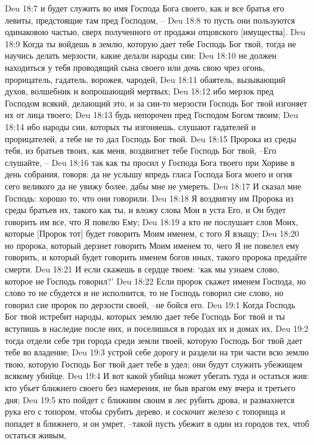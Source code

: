 Deu 18:7  и будет служить во имя Господа Бога своего, как и все братья его левиты, предстоящие там пред Господом, --
Deu 18:8  то пусть они пользуются одинаковою частью, сверх полученного от продажи отцовского [имущества].
Deu 18:9  Когда ты войдешь в землю, которую дает тебе Господь Бог твой, тогда не научись делать мерзости, какие делали народы сии:
Deu 18:10  не должен находиться у тебя проводящий сына своего или дочь свою чрез огонь, прорицатель, гадатель, ворожея, чародей,
Deu 18:11  обаятель, вызывающий духов, волшебник и вопрошающий мертвых;
Deu 18:12  ибо мерзок пред Господом всякий, делающий это, и за сии-то мерзости Господь Бог твой изгоняет их от лица твоего;
Deu 18:13  будь непорочен пред Господом Богом твоим;
Deu 18:14  ибо народы сии, которых ты изгоняешь, слушают гадателей и прорицателей, а тебе не то дал Господь Бог твой.
Deu 18:15  Пророка из среды тебя, из братьев твоих, как меня, воздвигнет тебе Господь Бог твой, --Его слушайте, --
Deu 18:16  так как ты просил у Господа Бога твоего при Хориве в день собрания, говоря: да не услышу впредь гласа Господа Бога моего и огня сего великого да не увижу более, дабы мне не умереть.
Deu 18:17  И сказал мне Господь: хорошо то, что они говорили.
Deu 18:18  Я воздвигну им Пророка из среды братьев их, такого как ты, и вложу слова Мои в уста Его, и Он будет говорить им все, что Я повелю Ему;
Deu 18:19  а кто не послушает слов Моих, которые [Пророк тот] будет говорить Моим именем, с того Я взыщу;
Deu 18:20  но пророка, который дерзнет говорить Моим именем то, чего Я не повелел ему говорить, и который будет говорить именем богов иных, такого пророка предайте смерти.
Deu 18:21  И если скажешь в сердце твоем: `как мы узнаем слово, которое не Господь говорил?'
Deu 18:22  Если пророк скажет именем Господа, но слово то не сбудется и не исполнится, то не Господь говорил сие слово, но говорил сие пророк по дерзости своей, --не бойся его.
Deu 19:1  Когда Господь Бог твой истребит народы, которых землю дает тебе Господь Бог твой и ты вступишь в наследие после них, и поселишься в городах их и домах их,
Deu 19:2  тогда отдели себе три города среди земли твоей, которую Господь Бог твой дает тебе во владение;
Deu 19:3  устрой себе дорогу и раздели на три части всю землю твою, которую Господь Бог твой дает тебе в удел; они будут служить убежищем всякому убийце.
Deu 19:4  И вот какой убийца может убегать туда и остаться жив: кто убьет ближнего своего без намерения, не быв врагом ему вчера и третьего дня;
Deu 19:5  кто пойдет с ближним своим в лес рубить дрова, и размахнется рука его с топором, чтобы срубить дерево, и соскочит железо с топорища и попадет в ближнего, и он умрет, --такой пусть убежит в один из городов тех, чтоб остаться живым,
